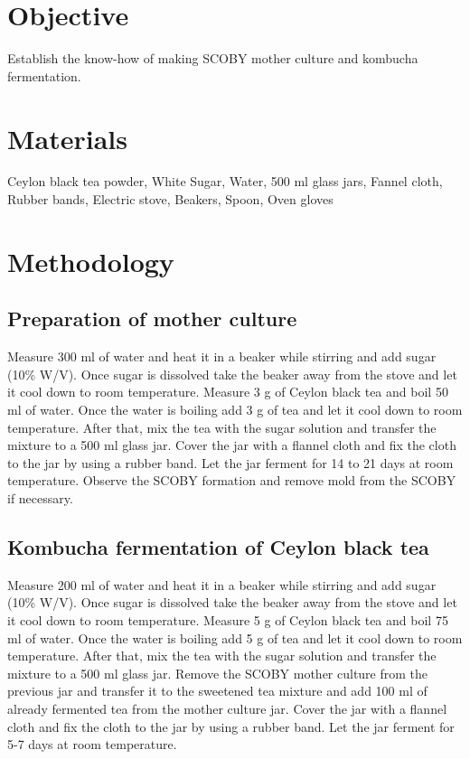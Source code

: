 \documentclass[12pt]{article}
\begin{document}
	\section{Objective}
	\label{sec:objective}
	
Establish the know-how of making SCOBY mother  culture and kombucha fermentation.
	
	
	\section{Materials}
	\label{sec:materials}
	
	Ceylon black tea powder, White Sugar, Water, 500 ml glass jars, Fannel cloth, Rubber bands, Electric stove, Beakers, Spoon, Oven gloves


	
	\section{Methodology}
	\label{sec:metodology}
	
	

 
\subsection{Preparation of mother culture
}

Measure 300 ml of water and heat it in a beaker while stirring and add sugar (10\% W/V). Once sugar is dissolved take the beaker away from the stove and let it cool down to room temperature. Measure 3 g of Ceylon black tea and boil 50 ml of water. Once the water is boiling add 3 g of tea and let it cool down to room temperature. After that, mix the tea with the sugar solution and transfer the mixture to a 500 ml glass jar. Cover the jar with a flannel cloth and fix the cloth to the jar by using a rubber band. Let the jar ferment for 14 to 21 days at room temperature. Observe the SCOBY formation and remove mold from the SCOBY if necessary.



\subsection{Kombucha fermentation of Ceylon black tea }
Measure 200 ml of water and heat it in a beaker while stirring and add sugar (10\% W/V). Once sugar is dissolved take the beaker away from the stove and let it cool down to room temperature. Measure 5 g of Ceylon black tea and boil 75 ml of water. Once the water is boiling add 5 g of tea and let it cool down to room temperature. After that, mix the tea with the sugar solution and transfer the mixture to a 500 ml glass jar.  Remove the SCOBY mother culture from the previous jar and transfer it to the sweetened tea mixture and add 100 ml of already fermented tea from the mother culture jar. Cover the jar with a flannel cloth and fix the cloth to the jar by using a rubber band. Let the jar ferment for 5-7 days at room temperature. 
\end{document}
